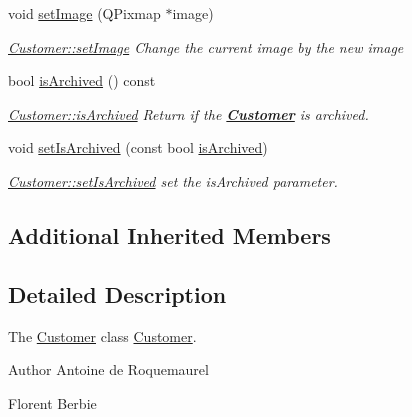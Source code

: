 \begin{DoxyCompactItemize}
void \hyperlink{classModels_1_1Customer_ac164f9bd8221da51ce16a95e9a3890f0}{set\-Image} (Q\-Pixmap $\ast$image)
\begin{DoxyCompactList}\small\item\em \hyperlink{classModels_1_1Customer_ac164f9bd8221da51ce16a95e9a3890f0}{Customer\-::set\-Image} Change the current image by the new {\itshape image} \end{DoxyCompactList}\item 
bool \hyperlink{classModels_1_1Customer_a1dfb958b33d0fcc9892fe902487be43d}{is\-Archived} () const 
\begin{DoxyCompactList}\small\item\em \hyperlink{classModels_1_1Customer_a1dfb958b33d0fcc9892fe902487be43d}{Customer\-::is\-Archived} Return if the {\bfseries \hyperlink{classModels_1_1Customer}{Customer}} is archived. \end{DoxyCompactList}\item 
void \hyperlink{classModels_1_1Customer_a15ec2603da3dd66c9355a9604b5abded}{set\-Is\-Archived} (const bool \hyperlink{classModels_1_1Customer_a1dfb958b33d0fcc9892fe902487be43d}{is\-Archived})
\begin{DoxyCompactList}\small\item\em \hyperlink{classModels_1_1Customer_a15ec2603da3dd66c9355a9604b5abded}{Customer\-::set\-Is\-Archived} set the {\itshape is\-Archived} parameter. \end{DoxyCompactList}\end{DoxyCompactItemize}
\subsection*{Additional Inherited Members}


\subsection{Detailed Description}
The \hyperlink{classModels_1_1Customer}{Customer} class \hyperlink{classModels_1_1Customer}{Customer}. 

\begin{DoxyAuthor}{Author}
Antoine de Roquemaurel 

Florent Berbie 
\end{DoxyAuthor}


